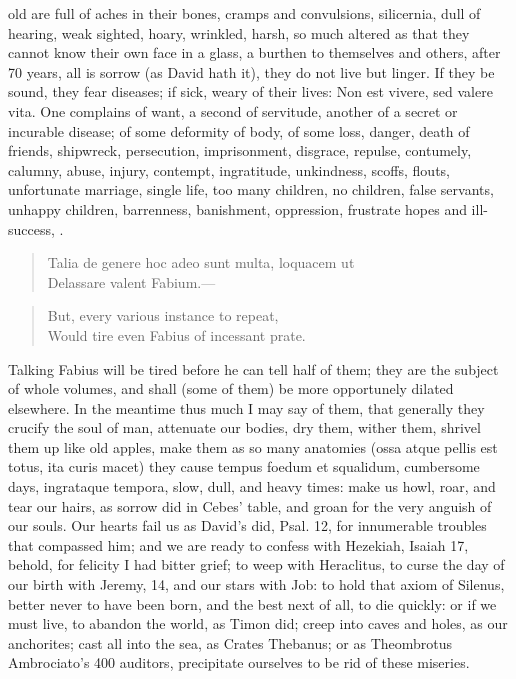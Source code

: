 {old are full of aches in their bones, cramps and convulsions,
silicernia, dull of hearing, weak sighted, hoary, wrinkled, harsh, so
much altered as that they cannot know their own face in a glass, a
burthen to themselves and others, after 70 years, all is sorrow (as
David hath it), they do not live but linger. If they be sound, they
fear diseases; if sick, weary of their lives: Non est vivere, sed
valere vita. One complains of want, a second of servitude,
another of a secret or incurable disease; of some deformity of
body, of some loss, danger, death of friends, shipwreck, persecution,
imprisonment, disgrace, repulse,  contumely, calumny, abuse,
injury, contempt, ingratitude, unkindness, scoffs, flouts, unfortunate
marriage, single life, too many children, no children, false servants,
unhappy children, barrenness, banishment, oppression, frustrate hopes
and ill-success, \etc{}.
%
\begin{verse}
\textlatin{Talia de genere hoc adeo sunt multa, loquacem ut}\\
\textlatin{Delassare valent Fabium}.---
\end{verse}
\translationrule
\begin{verse}
But, every various instance to repeat,\\
Would tire even Fabius of incessant prate.
\end{verse}

Talking Fabius will be tired before he can tell half of them; they are
the subject of whole volumes, and shall (some of them) be more
opportunely dilated elsewhere. In the meantime thus much I may say of
them, that generally they crucify the soul of man, attenuate our
bodies, dry them, wither them, shrivel them up like old apples, make
them as so many anatomies (ossa atque pellis est totus, ita curis
macet) they cause tempus foedum et squalidum, cumbersome days,
ingrataque tempora, slow, dull, and heavy times: make us howl, roar,
and tear our hairs, as sorrow did in Cebes' table, and groan for
the very anguish of our souls. Our hearts fail us as David's did, Psal.
 12, for innumerable troubles that compassed him; and we are ready
to confess with Hezekiah, Isaiah  17, behold, for felicity I had
bitter grief; to weep with Heraclitus, to curse the day of our birth
with Jeremy,  14, and our stars with Job: to hold that axiom of
Silenus, better never to have been born, and the best next of
all, to die quickly: or if we must live, to abandon the world, as Timon
did; creep into caves and holes, as our anchorites; cast all into the
sea, as Crates Thebanus; or as Theombrotus Ambrociato's 400 auditors,
precipitate ourselves to be rid of these miseries.

}

